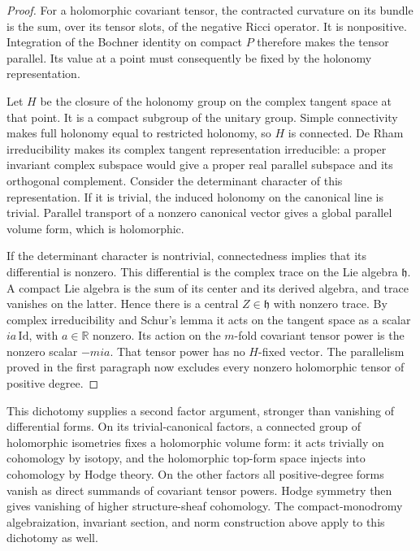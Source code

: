 \begin{proof}
For a holomorphic covariant tensor, the contracted curvature on its
bundle is the sum, over its tensor slots, of the negative Ricci
operator.  It is nonpositive.  Integration of the Bochner identity
on compact $P$ therefore makes the tensor parallel.  Its value at
a point must consequently be fixed by the holonomy representation.

Let $H$ be the closure of the holonomy group on the complex tangent
space at that point.  It is a compact subgroup of the unitary group.
Simple connectivity makes full holonomy equal to restricted holonomy,
so $H$ is connected.  De Rham irreducibility makes its complex tangent
representation irreducible: a proper invariant complex subspace
would give a proper real parallel subspace and its orthogonal
complement.  Consider the determinant character of this
representation.  If it is trivial, the induced holonomy on the
canonical line is trivial.  Parallel transport of a nonzero canonical
vector gives a global parallel volume form, which is holomorphic.

If the determinant character is nontrivial, connectedness implies
that its differential is nonzero.  This differential is the complex
trace on the Lie algebra $\mathfrak h$.  A compact Lie algebra is the
sum of its center and its derived algebra, and trace vanishes on the
latter.  Hence there is a central $Z\in\mathfrak h$ with nonzero
trace.  By complex irreducibility and Schur's lemma it acts on the
tangent space as a scalar $ia\,\mathrm{Id}$, with $a\in\mathbb R$
nonzero.  Its action on the $m$-fold covariant tensor power is the
nonzero scalar $-mia$.  That tensor power has no $H$-fixed vector.
The parallelism proved in the first paragraph now excludes every
nonzero holomorphic tensor of positive degree.
\end{proof}

This dichotomy supplies a second factor argument, stronger than
vanishing of differential forms.  On its trivial-canonical factors,
a connected group of holomorphic isometries fixes a holomorphic
volume form: it acts trivially on cohomology by isotopy, and the
holomorphic top-form space injects into cohomology by Hodge theory.
On the other factors all positive-degree forms vanish as direct
summands of covariant tensor powers.  Hodge symmetry then gives
vanishing of higher structure-sheaf cohomology.  The compact-monodromy
algebraization, invariant section, and norm construction above apply
to this dichotomy as well.
